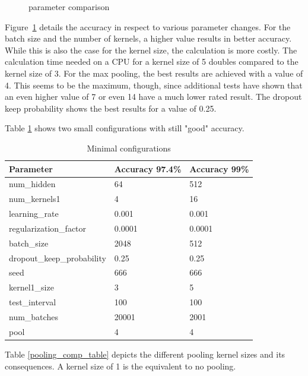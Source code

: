 \documentclass{article}
\begin{document}
\begin{enumerate}
\begin{item}
\begin{figure}
			\caption{parameter comparison}
			\label{fig:parameters}
		\end{figure}
		Figure~\ref{fig:parameters} details the accuracy in respect to various parameter changes. For the batch size and the number of kernels, a higher value results in better accuracy. While this is also the case for the kernel size, the calculation is more costly. The calculation time needed on a CPU for a kernel size of 5 doubles compared to the kernel size of 3. For the max pooling, the best results are achieved with a value of 4. This seems to be the maximum, though, since additional tests have shown that an even higher value of 7 or even 14 have a much lower rated result.
		The dropout keep probability shows the best results for a value of 0.25. 
		
	\end{item}
	\begin{item}
		Table \ref{smallest_conf} shows two small configurations with still "good" accuracy.
		\begin{table}[h]
			\caption{Minimal configurations}
			\label{smallest_conf}
			\centering
			\begin{tabular}{lll}
				\toprule
				Parameter     & Accuracy 97.4\%     & Accuracy 99\% \\
				\midrule
				num\_hidden & 64 & 512 \\
				num\_kernels1 & 4 & 16 \\
				learning\_rate & 0.001 & 0.001 \\
				regularization\_factor & 0.0001 & 0.0001 \\
				batch\_size & 2048 & 512 \\
				dropout\_keep\_probability & 0.25 & 0.25 \\
				seed & 666 & 666 \\
				kernel1\_size & 3 & 5 \\
				test\_interval & 100 & 100 \\
				num\_batches & 20001 & 2001 \\
				pool & 4 & 4 \\
				
				
				\bottomrule
			\end{tabular}
		\end{table}
	\end{item}
	\begin{item}
		Table \ref{pooling_comp_table} depicts the different pooling kernel sizes and its consequences. A kernel size of 1 is the equivalent to no pooling.
		

\end{item}
\end{enumerate}
\end{document}
